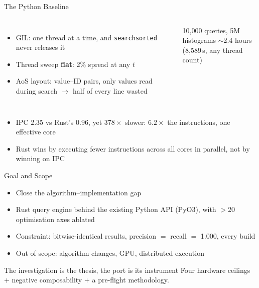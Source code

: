 \documentclass[aspectratio=169,10pt]{beamer}
\begin{document}
\begin{frame}{The Python Baseline}
  \begin{columns}[T]
    \begin{itemize}
      \item GIL: one thread at a time, and \texttt{searchsorted} never releases it
      \item Thread sweep \textbf{flat}: 2\% spread at any $t$
      \item AoS layout: value--ID pairs, only values read during search $\to$ half of every line wasted
    \end{itemize}
    \begin{block}{10{,}000 queries, 5M histograms}
      \centering
      \Large $\sim$2.4 hours \\[0.5ex]
      \normalsize (8{,}589\,s, any thread count)
    \end{block}
  \end{columns}
  \vfill
  \begin{itemize}
    \item IPC 2.35 vs Rust's 0.96, yet $378\times$ slower: $6.2\times$ the instructions, one effective core
    \item Rust wins by executing fewer instructions across all cores in parallel, not by winning on IPC
  \end{itemize}
\end{frame}

\begin{frame}{Goal and Scope}
  \begin{itemize}
    \item Close the algorithm--implementation gap
    \item Rust query engine behind the existing Python API (PyO3), with $>$20 optimisation axes ablated
    \item Constraint: bitwise-identical results, precision $=$ recall $=$ 1.000, every build
    \item Out of scope: algorithm changes, GPU, distributed execution
  \end{itemize}
  \vfill
  \begin{alertblock}{The investigation is the thesis, the port is its instrument}
    Four hardware ceilings $+$ negative composability $+$ a pre-flight methodology.
  \end{alertblock}
\end{frame}

\end{document}

